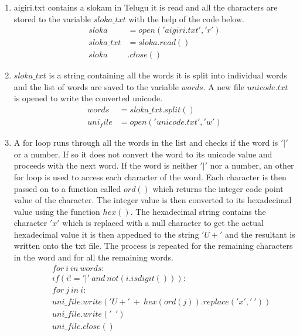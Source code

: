 \renewcommand{\theequation}{\theenumi}
\begin{enumerate}[label=\thesection.\arabic*.,ref=\thesection.\theenumi]

\item aigiri.txt contains a slokam in Telugu it is read and all the characters are stored to the variable $sloka\_txt$ with the help of the code below.
\begin{align*}
sloka &= open('aigiri.txt', 'r') \\
sloka\_txt &= sloka.read() \\
sloka &. close()
\end{align*}

\item $sloka\_txt$ is a string containing all the words it is split into individual words and the list of words are saved to the variable $words$. A new file $unicode.txt$ is opened to write the converted unicode.
\begin{align*} 
words &= sloka\_txt.split() \\
uni_file &= open('unicode.txt', 'w')
\end{align*}

\item A  for loop runs through all the words in the list and checks if the word is $'|'$ or a number. If so it does not convert the word to its unicode value and proceeds with the next word. If the word is neither $'|'$ nor a number, an other for loop is used to access each character of the word. Each character is then passed on to a function called $ord()$ which returns the integer code point value of the character. The integer value is then converted to its hexadecimal value using the function $hex()$. The hexadecimal string contains the character $'x'$ which is replaced with a null character to get the actual hexadecimal value it is then appedned to the string $'U+'$ and the resultant is written onto the txt file. The process is repeated for the remaining characters in the word and for all the remaining words.
\begin{align*}
\ \ \ \ &for\ i\  in\  words:\\
&if(i !='|'\  and\  not(i.isdigit())):\\
&for\  j\  in\  i:\\
&uni\_file.write('U+'\  +\  hex(ord(j)).replace('x', '\ '))\\
&uni\_file.write('\ \ ')\\
&uni\_file.close()
\end{align*} 

\end{enumerate}
